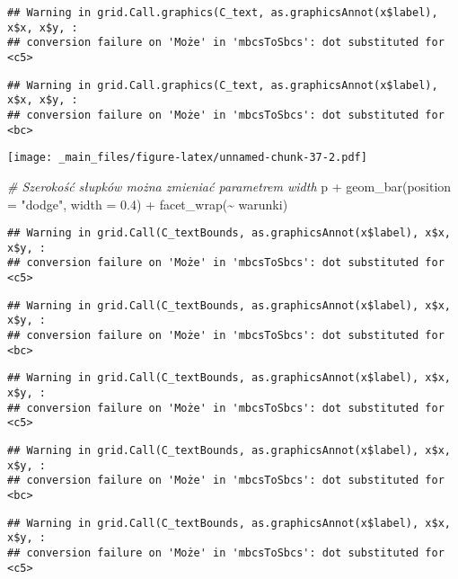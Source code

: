 \documentclass[
]{book}
\newenvironment{Shaded}{\begin{snugshade}}{\end{snugshade}}
\newcommand{\AttributeTok}[1]{\textcolor[rgb]{0.77,0.63,0.00}{#1}}
\newcommand{\CommentTok}[1]{\textcolor[rgb]{0.56,0.35,0.01}{\textit{#1}}}
\newcommand{\FloatTok}[1]{\textcolor[rgb]{0.00,0.00,0.81}{#1}}
\newcommand{\FunctionTok}[1]{\textcolor[rgb]{0.00,0.00,0.00}{#1}}
\newcommand{\NormalTok}[1]{#1}
\newcommand{\SpecialCharTok}[1]{\textcolor[rgb]{0.00,0.00,0.00}{#1}}
\newcommand{\StringTok}[1]{\textcolor[rgb]{0.31,0.60,0.02}{#1}}
\begin{document}
\begin{verbatim}
## Warning in grid.Call.graphics(C_text, as.graphicsAnnot(x$label), x$x, x$y, :
## conversion failure on 'Może' in 'mbcsToSbcs': dot substituted for <c5>
\end{verbatim}

\begin{verbatim}
## Warning in grid.Call.graphics(C_text, as.graphicsAnnot(x$label), x$x, x$y, :
## conversion failure on 'Może' in 'mbcsToSbcs': dot substituted for <bc>
\end{verbatim}

\texttt{[image: \_main\_files/figure-latex/unnamed-chunk-37-2.pdf]}

\begin{Shaded}
\begin{Highlighting}[]
\CommentTok{\# Szerokość słupków można zmieniać parametrem width}
\NormalTok{p }\SpecialCharTok{+} \FunctionTok{geom\_bar}\NormalTok{(}\AttributeTok{position =} \StringTok{"dodge"}\NormalTok{, }\AttributeTok{width =} \FloatTok{0.4}\NormalTok{) }\SpecialCharTok{+} \FunctionTok{facet\_wrap}\NormalTok{(}\SpecialCharTok{\textasciitilde{}}\NormalTok{ warunki)}
\end{Highlighting}
\end{Shaded}

\begin{verbatim}
## Warning in grid.Call(C_textBounds, as.graphicsAnnot(x$label), x$x, x$y, :
## conversion failure on 'Może' in 'mbcsToSbcs': dot substituted for <c5>
\end{verbatim}

\begin{verbatim}
## Warning in grid.Call(C_textBounds, as.graphicsAnnot(x$label), x$x, x$y, :
## conversion failure on 'Może' in 'mbcsToSbcs': dot substituted for <bc>
\end{verbatim}

\begin{verbatim}
## Warning in grid.Call(C_textBounds, as.graphicsAnnot(x$label), x$x, x$y, :
## conversion failure on 'Może' in 'mbcsToSbcs': dot substituted for <c5>
\end{verbatim}

\begin{verbatim}
## Warning in grid.Call(C_textBounds, as.graphicsAnnot(x$label), x$x, x$y, :
## conversion failure on 'Może' in 'mbcsToSbcs': dot substituted for <bc>
\end{verbatim}

\begin{verbatim}
## Warning in grid.Call(C_textBounds, as.graphicsAnnot(x$label), x$x, x$y, :
## conversion failure on 'Może' in 'mbcsToSbcs': dot substituted for <c5>
\end{verbatim}
\end{document}
